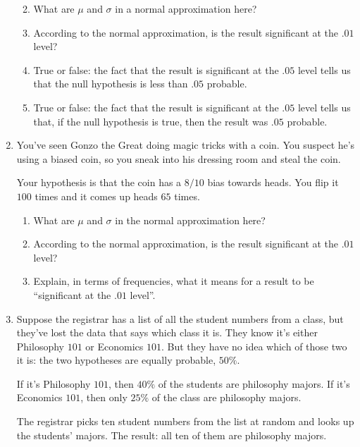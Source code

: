 \documentclass[justified]{tufte-book}
\providecommand{\tightlist}{%
  \setlength{\itemsep}{0pt}\setlength{\parskip}{0pt}}
\theoremstyle{definition}
\theoremstyle{definition}
\theoremstyle{definition}
\theoremstyle{remark}
\begin{document}
\begin{enumerate}
  \begin{enumerate}
  \def\labelenumii{\alph{enumii}.}
  \tightlist
  \item
    What are \(\mu\) and \(\sigma\) in a normal approximation here?
  \item
    According to the normal approximation, is the result significant at
    the \(.01\) level?
  \item
    True or false: the fact that the result is significant at the
    \(.05\) level tells us that the null hypothesis is less than \(.05\)
    probable.
  \item
    True or false: the fact that the result is significant at the
    \(.05\) level tells us that, if the null hypothesis is true, then
    the result was \(.05\) probable.
  \end{enumerate}
\item
  You've seen Gonzo the Great doing magic tricks with a coin. You
  suspect he's using a biased coin, so you sneak into his dressing room
  and steal the coin.

  Your hypothesis is that the coin has a \(8/10\) bias towards heads.
  You flip it \(100\) times and it comes up heads \(65\) times.

  \begin{enumerate}
  \def\labelenumii{\alph{enumii}.}
  \tightlist
  \item
    What are \(\mu\) and \(\sigma\) in the normal approximation here?
  \item
    According to the normal approximation, is the result significant at
    the \(.01\) level?
  \item
    Explain, in terms of frequencies, what it means for a result to be
    ``significant at the \(.01\) level''.
  \end{enumerate}
\item
  Suppose the registrar has a list of all the student numbers from a
  class, but they've lost the data that says which class it is. They
  know it's either Philosophy \(101\) or Economics \(101\). But they
  have no idea which of those two it is: the two hypotheses are equally
  probable, \(50\%\).

  If it's Philosophy \(101\), then \(40\%\) of the students are
  philosophy majors. If it's Economics \(101\), then only \(25\%\) of
  the class are philosophy majors.

  The registrar picks ten student numbers from the list at random and
  looks up the students' majors. The result: all ten of them are
  philosophy majors.


\end{enumerate}
\end{document}
